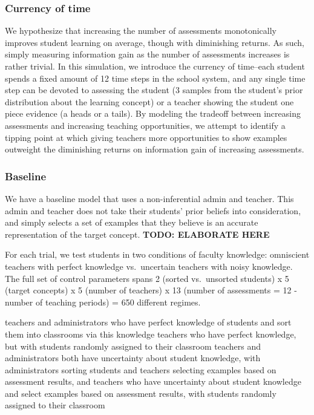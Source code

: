 \documentclass[man]{apa6}
\begin{document}
\subsubsection{Currency of time}\label{currency-of-time}

We hypothesize that increasing the number of assessments monotonically
improves student learning on average, though with diminishing returns.
As such, simply measuring information gain as the number of assessments
increases is rather trivial. In this simulation, we introduce the
currency of time--each student spends a fixed amount of 12 time steps in
the school system, and any single time step can be devoted to assessing
the student (3 samples from the student's prior distribution about the
learning concept) or a teacher showing the student one piece evidence (a
heads or a tails). By modeling the tradeoff between increasing
assessments and increasing teaching opportunities, we attempt to
identify a tipping point at which giving teachers more opportunities to
show examples outweight the diminishing returns on information gain of
increasing assessments.

\subsubsection{Baseline}\label{baseline}

We have a baseline model that uses a non-inferential admin and teacher.
This admin and teacher does not take their students' prior beliefs into
consideration, and simply selects a set of examples that they believe is
an accurate representation of the target concept. \textbf{TODO:
ELABORATE HERE}

For each trial, we test students in two conditions of faculty knowledge:
omniscient teachers with perfect knowledge vs.~uncertain teachers with
noisy knowledge. The full set of control parameters spans 2 (sorted
vs.~unsorted students) x 5 (target concepts) x 5 (number of teachers) x
13 (number of assessments = 12 - number of teaching periods) = 650
different regimes.

teachers and administrators who have perfect knowledge of students and
sort them into classrooms via this knowledge teachers who have perfect
knowledge, but with students randomly assigned to their classroom
teachers and administrators both have uncertainty about student
knowledge, with administrators sorting students and teachers selecting
examples based on assessment results, and teachers who have uncertainty
about student knowledge and select examples based on assessment results,
with students randomly assigned to their classroom
\end{document}
